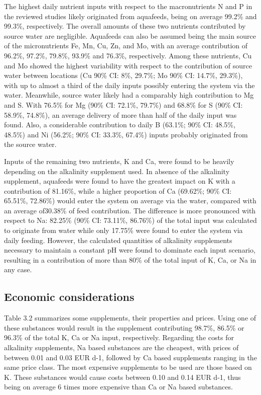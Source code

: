 \documentclass[preprint, 3p,
authoryear]{elsarticle} %
\begin{document}
The highest daily nutrient inputs with respect to the macronutrients N
and P in the reviewed studies likely originated from aquafeeds, being on
average 99.2\% and 99.3\%, respectively. The overall amounts of these
two nutrients contributed by source water are negligible. Aquafeeds can
also be assumed being the main source of the micronutrients Fe, Mn, Cu,
Zn, and Mo, with an average contribution of 96.2\%, 97.2\%, 79.8\%,
93.9\% and 76.3\%, respectively. Among these nutrients, Cu and Mo showed
the highest variability with respect to the contribution of source water
between locations (Cu 90\% CI: 8\%, 29.7\%; Mo 90\% CI: 14.7\%, 29.3\%),
with up to almost a third of the daily inputs possibly entering the
system via the water. Meanwhile, source water likely had a comparably
high contribution to Mg and S. With 76.5\% for Mg (90\% CI: 72.1\%,
79.7\%) and 68.8\% for S (90\% CI: 58.9\%, 74.8\%), an average delivery
of more than half of the daily input was found. Also, a considerable
contribution to daily B (63.1\%; 90\% CI: 48.5\%, 48.5\%) and Ni
(56.2\%; 90\% CI: 33.3\%, 67.4\%) inputs probably originated from the
source water.

Inputs of the remaining two nutrients, K and Ca, were found to be
heavily depending on the alkalinity supplement used. In absence of the
alkalinity supplement, aquafeeds were found to have the greatest impact
on K with a contribution of 81.16\%, while a higher proportion of Ca
(69.62\%; 90\% CI: 65.51\%, 72.86\%) would enter the system on average
via the water, compared with an average of30.38\% of feed contribution.
The difference is more pronounced with respect to Na: 82.25\% (90\% CI:
73.11\%, 86.76\%) of the total input was calculated to originate from
water while only 17.75\% were found to enter the system via daily
feeding. However, the calculated quantities of alkalinity supplements
necessary to maintain a constant pH were found to dominate each input
scenario, resulting in a contribution of more than 80\% of the total
input of K, Ca, or Na in any case.

\hypertarget{economic-considerations}{%
\subsection{Economic considerations}\label{economic-considerations}}

Table 3.2 summarizes some supplements, their properties and prices.
Using one of these substances would result in the supplement
contributing 98.7\%, 86.5\% or 96.3\% of the total K, Ca or Na input,
respectively. Regarding the costs for alkalinity supplements, Na based
substances are the cheapest, with prices of between 0.01 and 0.03 EUR
d-1, followed by Ca based supplements ranging in the same price class.
The most expensive supplements to be used are those based on K. These
substances would cause costs between 0.10 and 0.14 EUR d-1, thus being
on average 6 times more expensive than Ca or Na based substances.
\end{document}
